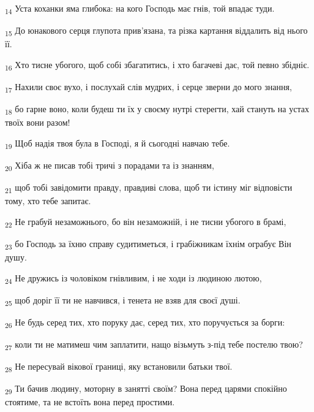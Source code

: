 \begin{tcolorbox}
\textsubscript{14} Уста коханки яма глибока: на кого Господь має гнів, той впадає туди.
\end{tcolorbox}
\begin{tcolorbox}
\textsubscript{15} До юнакового серця глупота прив'язана, та різка картання віддалить від нього її.
\end{tcolorbox}
\begin{tcolorbox}
\textsubscript{16} Хто тисне убогого, щоб собі збагатитись, і хто багачеві дає, той певно збідніє.
\end{tcolorbox}
\begin{tcolorbox}
\textsubscript{17} Нахили своє вухо, і послухай слів мудрих, і серце зверни до мого знання,
\end{tcolorbox}
\begin{tcolorbox}
\textsubscript{18} бо гарне воно, коли будеш ти їх у своєму нутрі стерегти, хай стануть на устах твоїх вони разом!
\end{tcolorbox}
\begin{tcolorbox}
\textsubscript{19} Щоб надія твоя була в Господі, я й сьогодні навчаю тебе.
\end{tcolorbox}
\begin{tcolorbox}
\textsubscript{20} Хіба ж не писав тобі тричі з порадами та із знанням,
\end{tcolorbox}
\begin{tcolorbox}
\textsubscript{21} щоб тобі завідомити правду, правдиві слова, щоб ти істину міг відповісти тому, хто тебе запитає.
\end{tcolorbox}
\begin{tcolorbox}
\textsubscript{22} Не грабуй незаможнього, бо він незаможній, і не тисни убогого в брамі,
\end{tcolorbox}
\begin{tcolorbox}
\textsubscript{23} бо Господь за їхню справу судитиметься, і грабіжникам їхнім ограбує Він душу.
\end{tcolorbox}
\begin{tcolorbox}
\textsubscript{24} Не дружись із чоловіком гнівливим, і не ходи із людиною лютою,
\end{tcolorbox}
\begin{tcolorbox}
\textsubscript{25} щоб доріг її ти не навчився, і тенета не взяв для своєї душі.
\end{tcolorbox}
\begin{tcolorbox}
\textsubscript{26} Не будь серед тих, хто поруку дає, серед тих, хто поручується за борги:
\end{tcolorbox}
\begin{tcolorbox}
\textsubscript{27} коли ти не матимеш чим заплатити, нащо візьмуть з-під тебе постелю твою?
\end{tcolorbox}
\begin{tcolorbox}
\textsubscript{28} Не пересувай вікової границі, яку встановили батьки твої.
\end{tcolorbox}
\begin{tcolorbox}
\textsubscript{29} Ти бачив людину, моторну в занятті своїм? Вона перед царями спокійно стоятиме, та не встоїть вона перед простими.
\end{tcolorbox}
